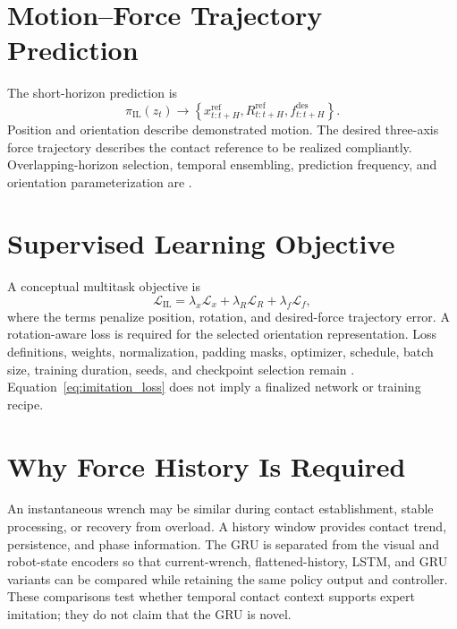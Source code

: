 \section{Motion--Force Trajectory Prediction}
The short-horizon prediction is
\begin{equation}
  \pi_{\mathrm{IL}}(z_t)
  \rightarrow
  \left\{
    x^{\mathrm{ref}}_{t:t+H},
    R^{\mathrm{ref}}_{t:t+H},
    f^{\mathrm{des}}_{t:t+H}
  \right\}.
  \label{eq:motion_force_prediction}
\end{equation}
Position and orientation describe demonstrated motion. The desired three-axis force trajectory describes the contact reference to be realized compliantly. Overlapping-horizon selection, temporal ensembling, prediction frequency, and orientation parameterization are .

\section{Supervised Learning Objective}
A conceptual multitask objective is
\begin{equation}
  \mathcal{L}_{\mathrm{IL}}
  =
  \lambda_x\mathcal{L}_{x}
  +\lambda_R\mathcal{L}_{R}
  +\lambda_f\mathcal{L}_{f},
  \label{eq:imitation_loss}
\end{equation}
where the terms penalize position, rotation, and desired-force trajectory error. A rotation-aware loss is required for the selected orientation representation. Loss definitions, weights, normalization, padding masks, optimizer, schedule, batch size, training duration, seeds, and checkpoint selection remain . Equation~\eqref{eq:imitation_loss} does not imply a finalized network or training recipe.

\section{Why Force History Is Required}
An instantaneous wrench may be similar during contact establishment, stable processing, or recovery from overload. A history window provides contact trend, persistence, and phase information. The GRU is separated from the visual and robot-state encoders so that current-wrench, flattened-history, LSTM, and GRU variants can be compared while retaining the same policy output and controller. These comparisons test whether temporal contact context supports expert imitation; they do not claim that the GRU is novel.

